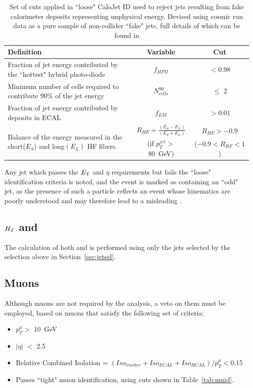 \begin{table}[htbp]
\centering
\begin{tabular}{ m{6.6cm}  c  c }
\hline
\hline
 \centering Definition & Variable & Cut \\
\hline
\hline
 \centering Fraction of jet energy contributed by the ``hottest" hybrid photo-diode &  $f_{HPD}$ & $< 0.98$ \\
 \centering Minimum number of cells required to contribute 90\% of the jet energy & $N^{90}_{cells}$ & $\leq$ 2 \\
 \centering Fraction of jet energy contributed by deposits in ECAL & $f_{EM}$ & $> 0.01$ \\
\multirow{2}{6.9cm}{Balance of the energy measured in the short($E_{S}$) and long$(E_{L})$ HF fibers.} &  $R_{HF} = \frac{(E_{S} - E_{L})}{ (E_{S} + E_{L})}$ & $R_{HF} > - 0.9$\\
& (if  $p_{T}^{jet}>$ 80~GeV)  &             ($-0.9 < R_{HF} < 1$)\\
\hline
\end{tabular}
\caption{\label{tab:jetid} Set of cuts applied in ``loose" CaloJet ID used to reject jets resulting from fake calorimeter deposits representing unphysical energy. Devised using cosmic run data as a pure sample of non-collider ``fake" jets, full details of which can be found in \cite{JME-09-008}}
\end{table}


Any jet which passes the ${E_{\text T}}$ and $\eta$ requirements but fails the ``loose" identification criteria is noted, and the event is marked as containing an ``odd" jet, as the presence of such a particle reflects an event whose kinematics are poorly understood and may therefore lead to a misleading \MHT.
\subsection{$H_{T} $ and \MHT}
The calculation of both \HT and \MHT is performed using only the jets selected by the selection above in Section~\ref{sec:jetsel}.

\subsection{Muons} 
Although muons are not required by the analysis, a veto on them must be employed, based on muons that satisfy the following set of criteria:
\begin{itemize}
\item $p^{\mu}_{T} >$ 10~GeV
\item $| \eta|$ $<$ 2.5
\item Relative Combined Isolation = $(Iso_{tracker} + Iso_{ECAL} + Iso_{HCAL}) / p^{\mu}_{T} < $0.15\footnotemark
\item Passes ``tight" muon identification, using cuts shown in Table~\ref{tab:muid}.
\end{itemize}

